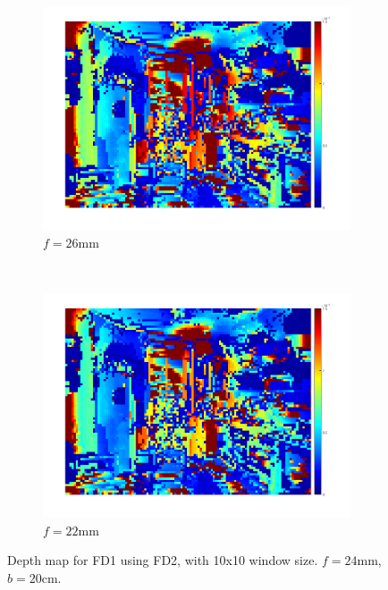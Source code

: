 \documentclass[a4paper, 10pt, conference]{ieeeconf}
\begin{document}
\begin{figure}[!ht]
  \captionsetup[subfigure]{position=b}
  \centering
    \begin{subfigure}{0.45\linewidth}
      \includegraphics[width=\textwidth]{pic/q2_2_e_focal1}
      \caption{$f = 26\text{mm}$}
      \label{fig:q2_2_e_focal1}
    \end{subfigure}
    ~
    \begin{subfigure}{0.45\linewidth}
      \includegraphics[width=\textwidth]{pic/q2_2_e_focal2}
      \caption{$f = 22\text{mm}$}
      \label{fig:q2_2_e_focal2}
    \end{subfigure}

    \caption{Depth map for FD1 using FD2, with 10x10 window size. $f = 24\text{mm}$, $b = 20\text{cm}$.}
    \vspace{-0.5cm}
  \label{fig:q2_2_e_focal}
\end{figure}
\end{document}
